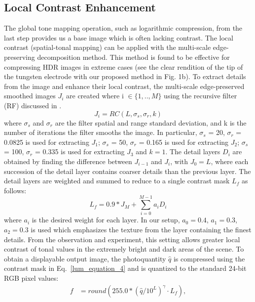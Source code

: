 \subsection{Local Contrast Enhancement}
The global tone mapping operation, such as logarithmic compression, from the last step provides us 
a base image which is often lacking contrast. The local contrast (spatial-tonal mapping) can be 
applied with the multi-scale edge-preserving decomposition method. This method is found to be 
effective for compressing HDR images in extreme cases (see the clear rendition of the tip of the 
tungsten electrode with our proposed method in Fig. 1b).
To extract details from the image and enhance their local contrast, the multi-scale edge-preserved 
smoothed images $J_i$ are created where i $\in\{1,..,M\}$ using the recursive filter (RF) discussed in 
\cite{GastalOliveira2011DomainTransform}.
\begin{equation}\label{lum_equation_4}
J_i = RC (L, \sigma_s, \sigma_r, k)
\end{equation}
where $\sigma_s$ and $\sigma_r$ are the filter spatial and range standard deviation, and k is the 
number of iterations the filter smooths the image. In particular, $\sigma_s$ = 20, $\sigma_r$ = 0.0825 
is used for extracting $J_1$; $\sigma_s$ = 50, $\sigma_r$ = 0.165 is used for extracting $J_2$; $
\sigma_s$ = 100, $\sigma_r$ = 0.335 is used for extracting $J_3$ and $k=1$. The detail layers $D_i$ 
are obtained by finding the difference between $J_{i-1}$ and $J_i$, with $J_0=L$, where each 
succession of the detail layer contains coarser details than the previous layer. The detail layers are 
weighted and summed to reduce to a single contrast mask $L_f$ as follows:
\begin{equation}
L_f = 0.9*J_M + \sum_{i=0}^{M-1}{a_i D_i}
\end{equation} where $a_i$ is the desired weight for each layer. In our setup, $a_0=0.4$, $a_1=0.3$, 
$a_2=0.3$ is used which emphasizes the texture from the layer containing the finest details. From 
the observation and experiment, this setting allows greater local contrast of tonal values in the 
extremely bright and dark areas of the scene. To obtain a displayable output image, the photoquantity 
$\hat{q}$ is compressed using the contrast mask in Eq.~\ref{lum_equation_4} and is quantized to the 
standard 24-bit RGB pixel values:
\begin{equation}
\begin{split}
f &= round(255.0*(\hat{q}/10^{L})^{\gamma} \cdot L_f), \\
\end{split}
\end{equation}


